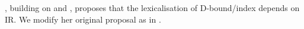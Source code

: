 \documentclass[output=paper,modfonts,nonflat
]{langsci/langscibook}
\begin{document}
\cite{nikolaeva2014}, building on \cite{chomsky1986,vikner1985,pica1987,pica1991,hestvik1992} and \cite{avrutin1994}, proposes that the lexicalisation of D-bound/index depends on IR. We modify her original proposal as in .

\end{document}
